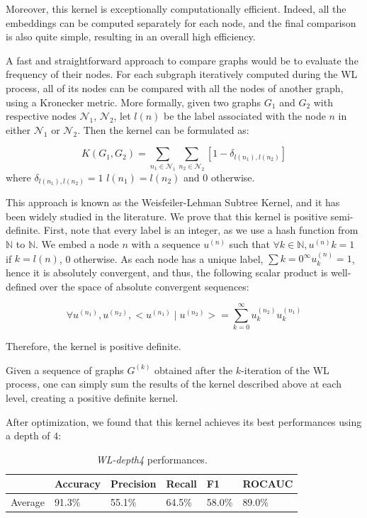 \documentclass{IEEEtran}
\begin{document}
Moreover, this kernel is exceptionally computationally efficient. Indeed, all the embeddings can be computed separately for each node, and the final comparison is also quite simple, resulting in an overall high efficiency.

A fast and straightforward approach to compare graphs would be to evaluate the frequency of their nodes.
For each subgraph iteratively computed during the WL process,
all of its nodes can be compared with all the nodes of another graph,
using a Kronecker metric.
More formally, given two graphs $G_1$ and $G_2$
with respective nodes $\mathcal{N}_1$, $\mathcal{N}_2$, let $l(n)$
be the label associated with the node $n$ in either $\mathcal{N}_1$ or $\mathcal{N}_2$.
Then the kernel can be formulated as:

\begin{equation*}
    K(G_1, G_2) = \sum_{n_1 \in \mathcal{N}_1} \sum_{n_2 \in \mathcal{N}_2} [1 - \delta_{l(n_1), l(n_2)}]
\end{equation*}
where $\delta_{l(n_1), l(n_2)} = 1$  $l(n_1) = l(n_2)$ and $0$ otherwise.

This approach is known as the Weisfeiler-Lehman Subtree Kernel, and it has been widely studied in the literature.
We prove that this kernel is positive semi-definite.
First, note that every label is an integer,
as we use a hash function from $\mathbb N $ to $\mathbb N $.
We embed a node $n$ with a sequence $u^{(n)}$ such that
$\forall k \in \mathbb{N}, u^{(n)}k = 1$ if $k = l(n)$, 0 otherwise.
As each node has a unique label, $\sum{k=0}^\infty u^{(n)}_k = 1$,
hence it is absolutely convergent, and thus, the following scalar product is well-defined over the space of absolute convergent sequences:

\begin{equation*}
    \forall u^{(n_1)}, u^{(n_2)}, < u^{(n_1)} \; | \; u^{(n_2)} > =
    \sum_{k=0}^\infty u^{(n_2)}_k u^{(n_1)}_k
\end{equation*}

Therefore, the kernel is positive definite.

Given a sequence of graphs $G^{(k)}$ obtained after the $k$-iteration of the WL process,
one can simply sum the results of the kernel described above at each level, creating a positive definite kernel.

After optimization, we found that this kernel achieves its best performances using a depth of $4$:

\begin{table}[h]
    \centering
    \begin{tabular}{l|llll|l}
                & Accuracy & Precision & Recall & F1     & ROCAUC \\
        \hline
        Average & 91.3\%   & 55.1\%    & 64.5\% & 58.0\% & 89.0\% \\
    \end{tabular}
    \caption{\emph{WL-depth4} performances.}
    \label{tab:wldepth4}
\end{table}
\end{document}
